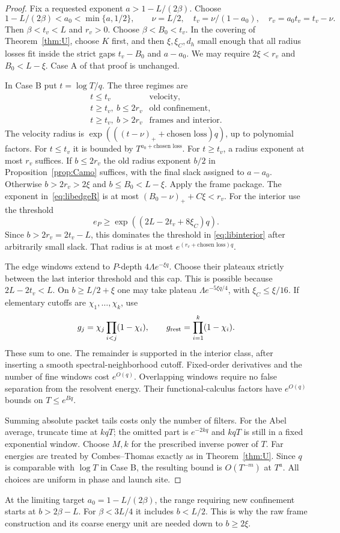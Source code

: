 \begin{proof}
Fix a requested exponent $a>1-L/(2\beta)$. Choose
\[
 1-L/(2\beta)<a_0<\min\{a,1/2\},\qquad
 \nu=L/2,\quad t_v=\nu/(1-a_0),\quad r_v=a_0t_v=t_v-\nu.
\]
Then $\beta<t_v<L$ and $r_v>0$. Choose
$\beta<B_0<t_v$. In the covering of Theorem~\ref{thm:U}, choose
$K$ first, and then $\xi,\xi_C,d_h$ small enough that all radius
losses fit inside the strict gaps $t_v-B_0$ and $a-a_0$.
We may require $2\xi<r_v$ and $B_0<L-\xi$.
Case A of that proof is unchanged.

In Case B put $t=\log T/q$. The three regimes are
\[
 \begin{array}{c|l}
  t\le t_v & \text{velocity},\\
  t\ge t_v,\ b\le2r_v & \text{old confinement},\\
  t\ge t_v,\ b>2r_v & \text{frames and interior}.
 \end{array}
\]
The velocity radius is
$\exp(((t-\nu)_++\text{chosen loss})q)$, up to polynomial factors.
For $t\le t_v$ it is bounded by $T^{a_0+\text{chosen loss}}$.
For $t\ge t_v$, a radius exponent at most $r_v$ suffices.
If $b\le2r_v$ the old radius exponent $b/2$ in
Proposition~\ref{prop:Camo} suffices, with the final slack assigned
to $a-a_0$. Otherwise $b>2r_v>2\xi$ and $b\le B_0<L-\xi$.
Apply the frame package. The exponent in~\eqref{eq:libedgeR} is at
most $(B_0-\nu)_++C\xi<r_v$.
For the interior use the threshold
\[
 e_P\ge \exp((2L-2t_v+8\xi_C)q).
\]
Since $b>2r_v=2t_v-L$, this dominates the threshold in
\eqref{eq:libinterior} after arbitrarily small slack. That radius
is at most $e^{(r_v+\text{chosen loss})q}$.

The edge windows extend to $P$-depth $4\Lambda e^{-\xi q}$.
Choose their plateaux strictly between the last interior threshold
and this cap. This is possible because $2L-2t_v<L$.
On $b\ge L/2+\xi$ one may take plateau
$\Lambda e^{-5\xi q/4}$, with $\xi_C\le\xi/16$.
If elementary cutoffs are $\chi_1,\ldots,\chi_k$, use
\[
 g_j=\chi_j\prod_{i<j}(1-\chi_i),\qquad
 g_{\rm rest}=\prod_{i=1}^k(1-\chi_i).
\]
These sum to one. The remainder is supported in the interior class,
after inserting a smooth spectral-neighborhood cutoff. Fixed-order
derivatives and the number of fine windows cost $e^{O(q)}$.
Overlapping windows require no false separation from the resolvent
energy. Their functional-calculus factors have $e^{O(q)}$ bounds
on $T\le e^{Bq}$.

Summing absolute packet tails costs only the number of filters.
For the Abel average, truncate time at $kqT$; the omitted part is
$e^{-2kq}$ and $kqT$ is still in a fixed exponential window.
Choose $M,k$ for the prescribed inverse power of $T$.
Far energies are treated by Combes--Thomas exactly as in
Theorem~\ref{thm:U}. Since $q$ is comparable with $\log T$ in
Case B, the resulting bound is $O(T^{-m})$ at $T^a$.
All choices are uniform in phase and launch site.
\end{proof}

\begin{remark}\label{rem:liblow}
At the limiting target $a_0=1-L/(2\beta)$, the range requiring new
confinement starts at $b>2\beta-L$. For $\beta<3L/4$ it includes
$b<L/2$. This is why the raw frame construction and its coarse
energy unit are needed down to $b\ge2\xi$.
\end{remark}
